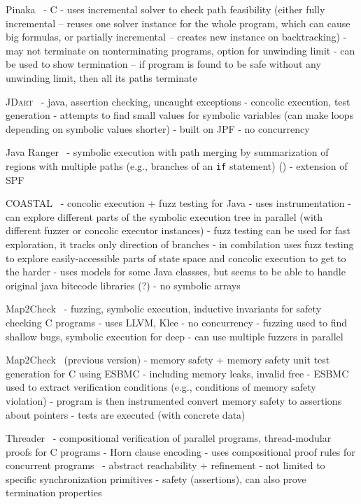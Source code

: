 Pinaka~
- C
- uses incremental solver to check path feasibility (either fully incremental -- reuses one solver instance for the whole program, which can cause big formulas, or partially incremental -- creates new instance on backtracking)
- may not terminate on nonterminating programs, option for unwinding limit
- can be used to show termination -- if program is found to be safe without any unwinding limit, then all its paths terminate

\textsc{JDart}~
- java, assertion checking, uncaught exceptions
- concolic execution, test generation
- attempts to find small values for symbolic variables (can make loops depending on symbolic values shorter)
- built on JPF
- no concurrency

Java Ranger~
- symbolic execution with path merging by summarization of regions with multiple paths (e.g., branches of an \texttt{if} statement) ()
- extension of SPF

COASTAL~
- concolic execution + fuzz testing for Java
- uses instrumentation
- can explore different parts of the symbolic execution tree in parallel (with different fuzzer or concolic executor instances)
- fuzz testing can be used for fast exploration, it tracks only direction of branches
- in combilation uses fuzz testing to explore easily-accessible parts of state space and concolic execution to get to the harder
- uses models for some Java classses, but seems to be able to handle original java bitecode libraries (?)
- no symbolic arrays

Map2Check~
- fuzzing, symbolic execution, inductive invariants for safety checking C programs
- uses LLVM, Klee
- no concurrency
- fuzzing used to find shallow bugs, symbolic execution for deep
- can use multiple fuzzers in parallel

Map2Check~ (previous version)
- memory safety + memory safety unit test generation for C using ESBMC
  - including memory leaks, invalid free
- ESBMC used to extract verification conditions (e.g., conditions of memory safety violation)
- program is then instrumented convert memory safety to assertions about pointers
- tests are executed (with concrete data)

Threader~
- compositional verification of parallel programs, thread-modular proofs for C programs
- Horn clause encoding
- uses compositional proof rules for concurrent programs~
- abstract reachability + refinement
- not limited to specific synchronization primitives
- safety (assertions), can also prove termination properties


